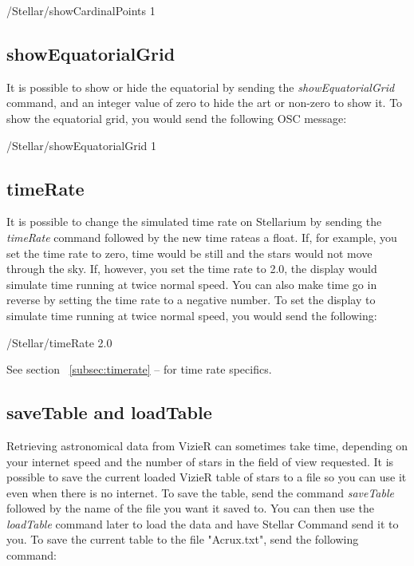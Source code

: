 \begin{syntax}	
	\medskip
	/Stellar/showCardinalPoints 1
	\medskip
\end{syntax}


\subsection{showEquatorialGrid}
It is possible to show or hide the equatorial by sending the \textit{showEquatorialGrid} command, and an integer value of zero to hide the art or non-zero to show it. To show the equatorial grid, you would send the following OSC message:

\begin{syntax}	
	\medskip
	/Stellar/showEquatorialGrid 1
	\medskip
\end{syntax}

\subsection{timeRate} 
It is possible to change the simulated time rate on Stellarium by sending the \textit{timeRate} command followed by the new time rateas a float. If, for example, you set the time rate to zero, time would be still and the stars would not move through the sky. If, however, you set the time rate to 2.0, the display would simulate time running at twice normal speed. You can also make time go in reverse by setting the time rate to a negative number. To set the display to simulate time running at twice normal speed, you would send the following:

\begin{syntax}	
	\medskip
	/Stellar/timeRate 2.0
	\medskip
\end{syntax}

See section ~\ref{subsec:timerate} --
\emph{} for time rate specifics.

\subsection{saveTable and loadTable}   
Retrieving astronomical data from VizieR can sometimes take time, depending on your internet speed and the number of stars in the field of view requested. It is possible to save the current loaded VizieR table of stars to a file so you can use it even when there is no internet. To save the table, send the command \textit{saveTable} followed by the name of the file you want it saved to. You can then use the \textit{loadTable} command later to load the data and have Stellar Command send it to you.
To save the current table to the file "Acrux.txt", send the following command:
 
